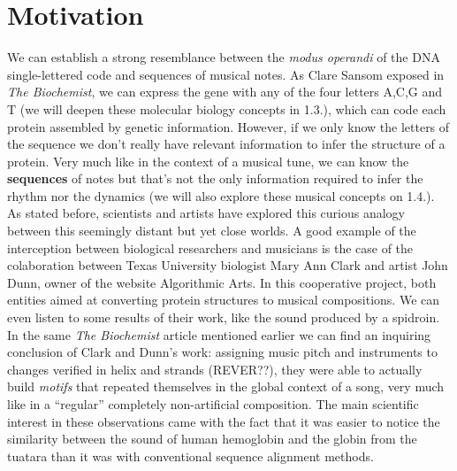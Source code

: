 \documentclass[11pt,twoside,a4paper]{report}
\begin{document}
\section{Motivation}
We can establish a strong resemblance between the \textit{modus operandi} of the DNA single-lettered code and sequences of musical notes. As Clare Sansom exposed in \textit{The Biochemist}\cite{cyberbio}, we can express the gene with any of the four letters A,C,G and T (we will deepen these molecular biology concepts in 1.3.), which can code each protein assembled by genetic information. However, if we only know the letters of the sequence we don't really have relevant information to infer the structure of a protein. Very much like in the context of a musical tune, we can know the \textbf{sequences} of notes but that's not the only information required to infer the rhythm nor the dynamics (we will also explore these musical concepts on 1.4.).  
As stated before, scientists and artists have explored this curious analogy between this seemingly distant but yet close worlds. A good example of the interception between biological researchers and musicians is the case of the colaboration between Texas University biologist Mary Ann Clark and artist John Dunn, owner of the website Algorithmic Arts\cite{algoart}. In this cooperative project, both entities aimed at converting protein structures to musical compositions. We can even listen to some results of their work, like the sound produced by a spidroin. In the same \textit{The Biochemist} article mentioned earlier we can find an inquiring conclusion of Clark and Dunn's work: assigning music pitch and instruments to changes verified in helix and strands (REVER??), they were able to actually build \textit{motifs} that repeated themselves in the global context of a song, very much like in a ``regular'' completely non-artificial composition. The main scientific interest in these observations came with the fact that it was easier to notice the similarity between the sound of human hemoglobin and the globin from the tuatara than it was with conventional sequence alignment methods.\\
\end{document}
